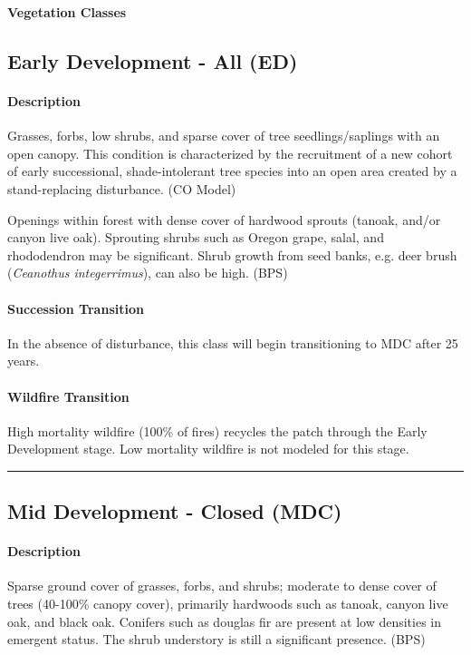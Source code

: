 \documentclass{article}
\begin{document}
\begin{snugshade}\Large \textbf{Vegetation Classes} \end{snugshade}


\subsection*{Early Development - All (ED)}

\paragraph*{Description} Grasses, forbs, low shrubs, and sparse cover of tree seedlings/saplings with an open canopy. This condition is characterized by the recruitment of a new cohort of early successional, shade-intolerant tree species into an open area created by a stand-replacing disturbance. (CO Model)

Openings within forest with dense cover of hardwood sprouts (tanoak, and/or canyon live oak). Sprouting shrubs such as Oregon grape, salal, and rhododendron may be significant. Shrub growth from seed banks, e.g. deer brush (\emph{Ceanothus integerrimus}), can also be high. (BPS)

\paragraph{Succession Transition} In the absence of disturbance, this class will begin transitioning to MDC after 25 years. 

\paragraph{Wildfire Transition} High mortality wildfire (100\% of fires) recycles the patch through the Early Development stage. Low mortality wildfire is not modeled for this stage.

\noindent\rule{6.5in}{.02pt}



\subsection*{Mid Development - Closed (MDC)}

\paragraph{Description}
Sparse ground cover of grasses, forbs, and shrubs; moderate to dense cover of trees (40-100\% canopy cover), primarily hardwoods such as tanoak, canyon live oak, and black oak. Conifers such as douglas fir are present at low densities in emergent status. The shrub understory is still a significant presence. (BPS)
\end{document}
